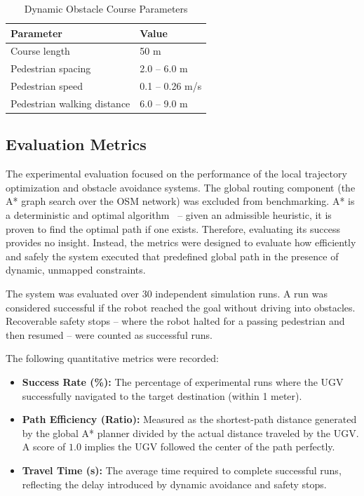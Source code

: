\begin{table}[htpb]
    \centering
    \caption{Dynamic Obstacle Course Parameters}
    \label{tab:obstacle-course-params}
    \begin{tabular}{ll}
        \hline
        \textbf{Parameter} & \textbf{Value} \\
        \hline
        Course length & 50 m \\
        Pedestrian spacing & 2.0 -- 6.0 m \\
        Pedestrian speed & 0.1 -- 0.26 m/s \\
        Pedestrian walking distance & 6.0 -- 9.0 m \\
        \hline
    \end{tabular}
\end{table}

\subsection{Evaluation Metrics}
\label{subsec:evaluation-metrics}

The experimental evaluation focused on the performance of the local trajectory optimization and obstacle avoidance systems. The global routing component (the A* graph search over the OSM network) was excluded from benchmarking. A* is a deterministic and optimal algorithm~\cite{hart1968astar} -- given an admissible heuristic, it is proven to find the optimal path if one exists. Therefore, evaluating its success provides no insight. Instead, the metrics were designed to evaluate how efficiently and safely the system executed that predefined global path in the presence of dynamic, unmapped constraints. 

The system was evaluated over 30 independent simulation runs. A run was considered successful if the robot reached the goal without driving into obstacles. Recoverable safety stops -- where the robot halted for a passing pedestrian and then resumed -- were counted as successful runs.

The following quantitative metrics were recorded:
\begin{itemize}
    \item \textbf{Success Rate (\%):} The percentage of experimental runs where the UGV successfully navigated to the target destination (within 1 meter).
    \item \textbf{Path Efficiency (Ratio):} Measured as the shortest-path distance generated by the global A* planner divided by the actual distance traveled by the UGV. A score of $1.0$ implies the UGV followed the center of the path perfectly.
    \item \textbf{Travel Time (s):} The average time required to complete successful runs, reflecting the delay introduced by dynamic avoidance and safety stops.
\end{itemize}

